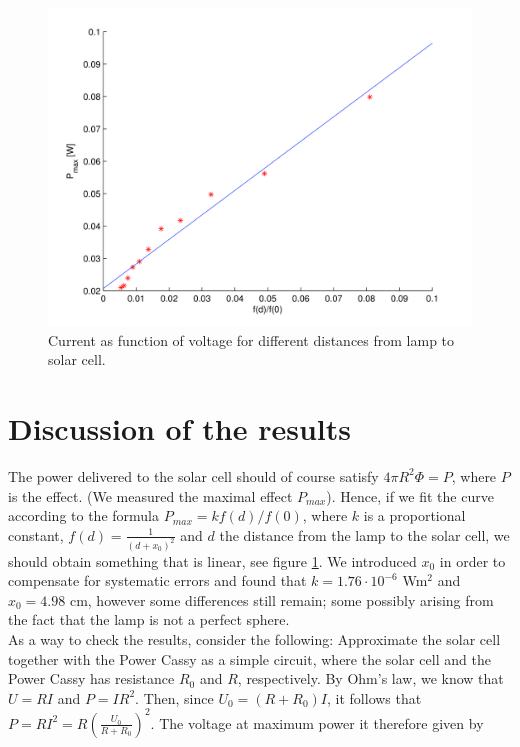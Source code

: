 \documentclass[12pt,a4paper]{article}
\begin{document}
\begin{figure}[!h]
  \begin{center}
    \includegraphics[scale=0.2]{pmaxvsf.png}
  \end{center}
  \caption{Current as function of voltage for different distances from lamp to solar cell.}
  \label{pmaxvsf}
\end{figure}
\vfill
\clearpage

\section{Discussion of the results}

The power delivered to the solar cell should of course satisfy $4\pi R^2\Phi = P$, where $P$ is the effect. (We measured the maximal effect $P_{max}$). Hence, if we fit the curve according to the formula $P_{max}=kf(d)/f(0)$, where $k$ is a proportional constant, $f(d)=\frac{1}{(d+x_0)^2}$ and $d$ the distance from the lamp to the solar cell, we should obtain something that is linear, see figure \ref{pmaxvsf}. We introduced $x_0$ in order to compensate for systematic errors and found that $k=1.76\cdot 10^{-6}$ Wm${}^2$ and $x_0=4.98$ cm, however some differences still remain; some possibly arising from the fact that the lamp is not a perfect sphere. \\

As a way to check the results, consider the following: Approximate the solar cell together with the Power Cassy as a simple circuit, where the solar cell and the Power Cassy has resistance $R_0$ and $R$, respectively. 
By Ohm's law, we know that $U=RI$ and $P=IR^2$. Then, since $U_0=(R+R_0)I$, it follows that $P=RI^2=R\left( \frac{U_0}{R+R_0} \right)^2$.
The voltage at maximum power it therefore given by
\end{document}

